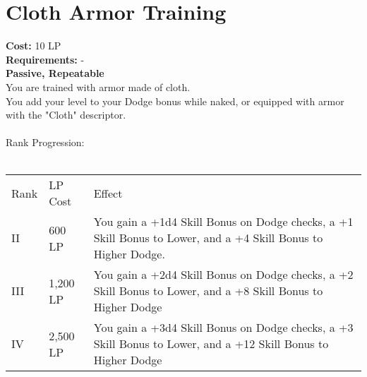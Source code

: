 \section{Cloth Armor Training}\label{perk:clothArmorTraining}
\textbf{Cost:} 10 LP\\
\textbf{Requirements:} -\\
\textbf{Passive, Repeatable}\\
You are trained with armor made of cloth.\\
You add your level to your Dodge bonus while naked, or equipped with armor with the "Cloth" descriptor.\\
\\

Rank Progression:\\
\\
\begin{longtable}{l | l | p{9cm}}
	Rank & LP Cost & Effect\\
	II & 600 LP & You gain a +1d4 Skill Bonus on Dodge checks, a +1 Skill Bonus to Lower, and a +4 Skill Bonus to Higher Dodge.\\
	III & 1,200 LP & You gain a +2d4 Skill Bonus on Dodge checks, a +2 Skill Bonus to Lower, and a +8 Skill Bonus to Higher Dodge\\
	IV & 2,500 LP & You gain a +3d4 Skill Bonus on Dodge checks, a +3 Skill Bonus to Lower, and a +12 Skill Bonus to Higher Dodge\\
\end{longtable}